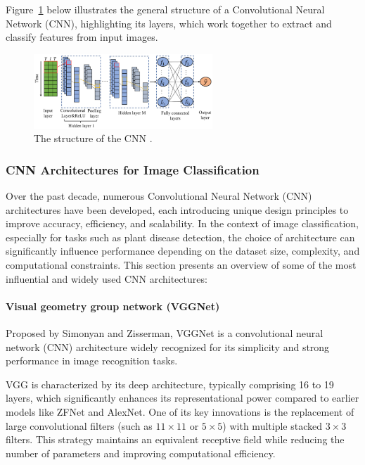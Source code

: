 Figure~\ref{fig:figure07} below illustrates the general structure of a Convolutional Neural Network (CNN), highlighting its layers, which work together to extract and classify features from input images.

\begin{figure}[H] %
    \centering
    \includegraphics[width=0.6\textwidth]{chapters/chapter1/images/Figure07.png}
    \caption{The structure of the CNN \parencite{crocioni2020li}.}
    \label{fig:figure07}
\end{figure}


\subsubsection{CNN Architectures for Image Classification}
Over the past decade, numerous Convolutional Neural Network (CNN) architectures have been developed, each introducing unique design principles to improve accuracy, efficiency, and scalability. In the context of image classification, especially for tasks such as plant disease detection, the choice of architecture can significantly influence performance depending on the dataset size, complexity, and computational constraints.
This section presents an overview of some of the most influential and widely used CNN architectures:

\paragraph{Visual geometry group network (VGGNet)}
Proposed by Simonyan and Zisserman, VGGNet is a convolutional neural network (CNN) architecture widely recognized for its simplicity and strong performance in image recognition tasks.

VGG is characterized by its deep architecture, typically comprising 16 to 19 layers, which significantly enhances its representational power compared to earlier models like ZFNet and AlexNet. One of its key innovations is the replacement of large convolutional filters (such as $11 \times 11$ or $5 \times 5$) with multiple stacked $3 \times 3$ filters. This strategy maintains an equivalent receptive field while reducing the number of parameters and improving computational efficiency.

